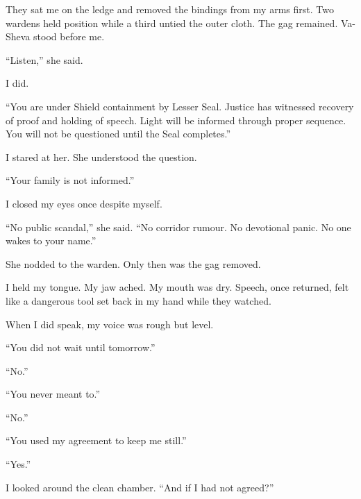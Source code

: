 They sat me on the ledge and removed the bindings from my arms first. Two wardens held position while a third untied the outer cloth. The gag remained. Va-Sheva stood before me.\par

``Listen,'' she said.\par

I did.\par

``You are under Shield containment by Lesser Seal. Justice has witnessed recovery of proof and holding of speech. Light will be informed through proper sequence. You will not be questioned until the Seal completes.''\par

I stared at her. She understood the question.\par

``Your family is not informed.''\par

I closed my eyes once despite myself.\par

``No public scandal,'' she said. ``No corridor rumour. No devotional panic. No one wakes to your name.''\par

She nodded to the warden. Only then was the gag removed.\par

I held my tongue. My jaw ached. My mouth was dry. Speech, once returned, felt like a dangerous tool set back in my hand while they watched.\par

When I did speak, my voice was rough but level.\par

``You did not wait until tomorrow.''\par

``No.''\par

``You never meant to.''\par

``No.''\par

``You used my agreement to keep me still.''\par

``Yes.''\par

I looked around the clean chamber. ``And if I had not agreed?''\par

